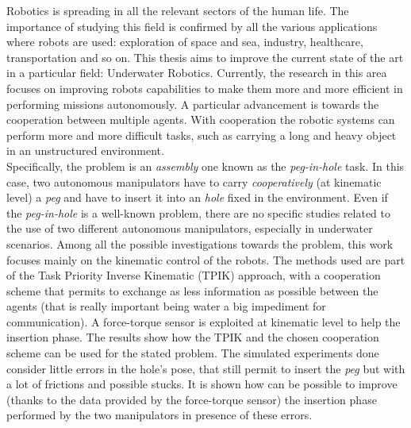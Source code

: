 


\begin{abstracts}

Robotics is spreading in all the relevant sectors of the human life. The importance of studying this field is confirmed by all the various applications where robots are used: exploration of space and sea, industry, healthcare, transportation and so on. This thesis aims to improve the current state of the art in a particular field: Underwater Robotics. Currently, the research in this area focuses on improving robots capabilities to make them more and more efficient in performing missions autonomously. A particular advancement is towards the cooperation between multiple agents. With cooperation the robotic systems can perform more and more difficult tasks, such as carrying a long and heavy object in an unstructured environment.\\
Specifically, the problem is an \textit{assembly} one known as the \mbox{\textit{peg-in-hole}} task. In this case, two autonomous manipulators have to carry \textit{cooperatively} (at kinematic level) a \textit{peg} and have to insert it into an \textit{hole} fixed in the environment. Even if the \textit{peg-in-hole} is a well-known problem, there are no specific studies related to the use of two different autonomous manipulators, especially in underwater scenarios. Among all the possible investigations towards the problem, this work focuses mainly on the kinematic control of the robots. The methods used are part of the Task Priority Inverse Kinematic (TPIK) approach, with a cooperation scheme that permits to exchange as less information as possible between the agents (that is really important being water a big impediment for communication). A force-torque sensor is exploited at kinematic level to help the insertion phase. The results show how the TPIK and the chosen cooperation scheme can be used for the stated problem. The simulated experiments done consider little errors in the hole's pose, that still permit to insert the \textit{peg} but with a lot of frictions and possible stucks. It is shown how can be possible to improve (thanks to the data provided by the force-torque sensor) the insertion phase performed by the two manipulators in presence of these errors.\\

\end{abstracts}
